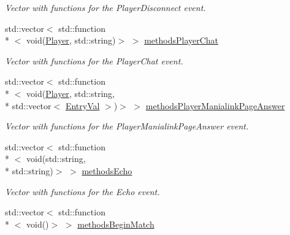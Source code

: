 \begin{DoxyCompactItemize}
\begin{DoxyCompactList}\small\item\em Vector with functions for the Player\-Disconnect event. \end{DoxyCompactList}\item 
\hypertarget{classEventManager_ae2e1c22386c1ea3397d29cbcf3d2523d}{std\-::vector$<$ std\-::function\\*
$<$ void(\hyperlink{structPlayer}{Player}, std\-::string)$>$ $>$ \hyperlink{classEventManager_ae2e1c22386c1ea3397d29cbcf3d2523d}{methods\-Player\-Chat}}\label{classEventManager_ae2e1c22386c1ea3397d29cbcf3d2523d}

\begin{DoxyCompactList}\small\item\em Vector with functions for the Player\-Chat event. \end{DoxyCompactList}\item 
\hypertarget{classEventManager_a28d7fbe547c5177f293208ccf4f98fce}{std\-::vector$<$ std\-::function\\*
$<$ void(\hyperlink{structPlayer}{Player}, std\-::string, \\*
std\-::vector$<$ \hyperlink{structEntryVal}{Entry\-Val} $>$)$>$ $>$ \hyperlink{classEventManager_a28d7fbe547c5177f293208ccf4f98fce}{methods\-Player\-Manialink\-Page\-Answer}}\label{classEventManager_a28d7fbe547c5177f293208ccf4f98fce}

\begin{DoxyCompactList}\small\item\em Vector with functions for the Player\-Manialink\-Page\-Answer event. \end{DoxyCompactList}\item 
\hypertarget{classEventManager_a61180225295324ec1240bb4a8d119866}{std\-::vector$<$ std\-::function\\*
$<$ void(std\-::string, \\*
std\-::string)$>$ $>$ \hyperlink{classEventManager_a61180225295324ec1240bb4a8d119866}{methods\-Echo}}\label{classEventManager_a61180225295324ec1240bb4a8d119866}

\begin{DoxyCompactList}\small\item\em Vector with functions for the Echo event. \end{DoxyCompactList}\item 
\hypertarget{classEventManager_abb7667e9222f00e33d792c733c82f89e}{std\-::vector$<$ std\-::function\\*
$<$ void()$>$ $>$ \hyperlink{classEventManager_abb7667e9222f00e33d792c733c82f89e}{methods\-Begin\-Match}}\label{classEventManager_abb7667e9222f00e33d792c733c82f89e}


\end{DoxyCompactItemize}
